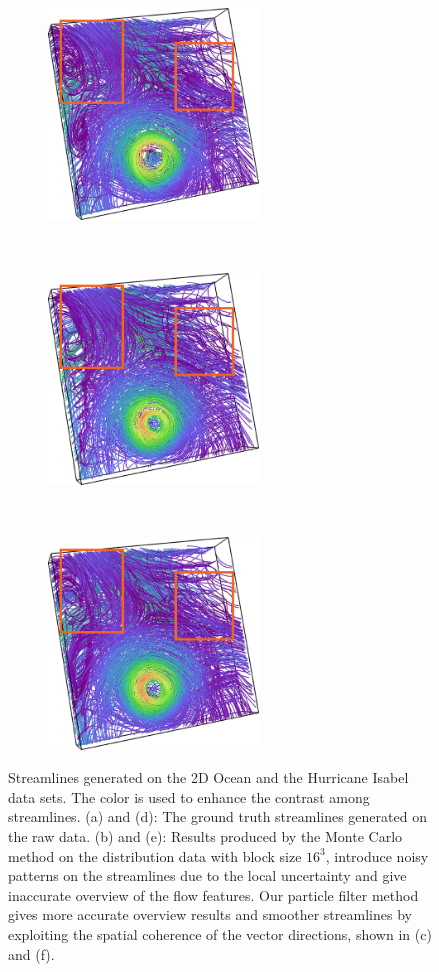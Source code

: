 \begin{figure}[!htb]
  \begin{subfigure}[!htb]{0.32\textwidth}
    \centering
    \includegraphics[width=2.2in]{../figures/isabel_gt.eps}
    \caption{}
  \end{subfigure}~
  \begin{subfigure}[!htb]{0.32\textwidth}
    \centering
    \includegraphics[width=2.2in]{../figures/isabel_mc.eps}
    \caption{}
  \end{subfigure}~
  \begin{subfigure}[!htb]{0.32\textwidth}
    \centering
    \includegraphics[width=2.2in]{../figures/isabel_smc.eps}
    \caption{}
  \end{subfigure}

  \caption{Streamlines generated on the 2D Ocean and the Hurricane Isabel data sets. The color is used to enhance the contrast among streamlines. (a) and (d): The ground truth streamlines generated on the raw data. (b) and (e): Results produced by the Monte Carlo method on the distribution data with block size $16^3$, introduce noisy patterns on the streamlines due to the local uncertainty and give inaccurate overview of the flow features. Our particle filter method gives more accurate overview results and smoother streamlines by exploiting the spatial coherence of the vector directions, shown in (c) and (f).}
  \label{data_overview}
\end{figure}

